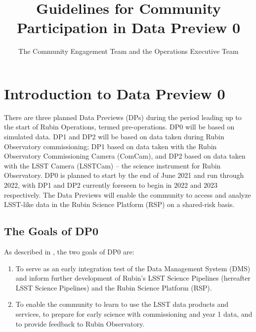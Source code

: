 \documentclass[DM,lsstdraft,authoryear,toc]{lsstdoc}
\title{Guidelines for Community Participation in Data Preview 0}
\author{The Community Engagement Team and the Operations Executive Team}
\date{\vcsDate}
\begin{document}
\maketitle

\renewcommand{\thepage}{\arabic{page}}%

\setcounter{page}{1}%


\section{Introduction to Data Preview 0}\label{sec:intro}

There are three planned Data Previews (DPs) during the period leading up to the start of Rubin Operations, termed pre-operations.
DP0 will be based on simulated data.
DP1 and DP2 will be based on data taken during Rubin Observatory commissioning; DP1 based on data taken with the Rubin Observatory Commissioning Camera (ComCam), and DP2 based on data taken with the LSST Camera (LSSTCam) -- the science instrument for Rubin Observatory.
DP0 is planned to start by the end of June 2021 and run through 2022, with DP1 and DP2 currently foreseen to begin in 2022 and 2023 respectively.
The Data Previews will enable the community to access and analyze LSST-like data in the Rubin Science Platform (RSP) on a shared-risk basis. 

\subsection{The Goals of DP0}\label{ssec:intro_goals}

As described in , the two goals of DP0 are:
\begin{enumerate}
\item To serve as an early integration test of the Data Management System (DMS) and inform further development of Rubin's LSST Science Pipelines (hereafter LSST Science Pipelines) and the Rubin Science Platform (RSP).
\item To enable the community to learn to use the LSST data products and services, to prepare for early science with commissioning and year 1 data, and to provide feedback to Rubin Observatory. 
\end{enumerate}
\end{document}
